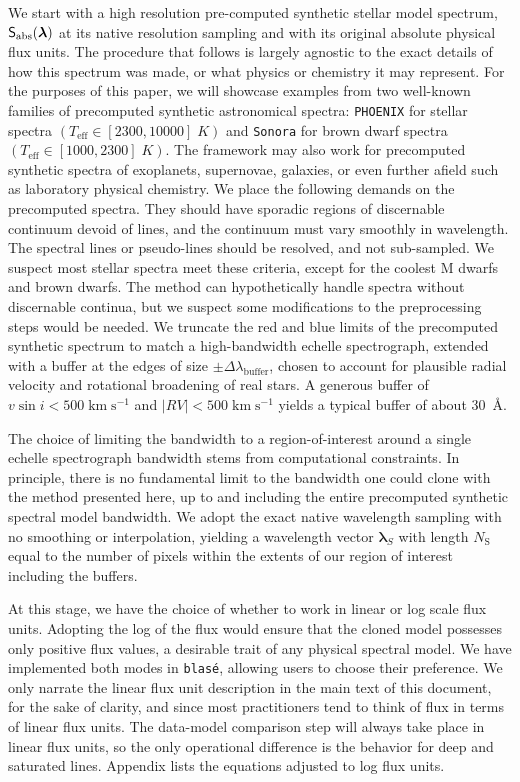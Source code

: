 \documentclass[modern]{aastex631}
\def\kmps{\mathrm{km}\;\mathrm{s}^{-1}}
\begin{document}
We start with a high resolution pre-computed synthetic stellar model spectrum, $\mathsf{S}_{\rm abs}(\bm{\lambda})$ at its native resolution sampling and with its original absolute physical flux units. The procedure that follows is largely agnostic to the exact details of how this spectrum was made, or what physics or chemistry it may represent. For the purposes of this paper, we will showcase examples from two well-known families of precomputed synthetic astronomical spectra: \texttt{PHOENIX} \citep{husser13} for stellar spectra $(T_{\mathrm{eff}}\in [2300, 10000]\;K)$ and \texttt{Sonora} \citep{2021ApJ...920...85M} for brown dwarf spectra $(T_{\mathrm{eff}}\in [1000, 2300]\;K)$. The framework may also work for precomputed synthetic spectra of exoplanets, supernovae, galaxies, or even further afield such as laboratory physical chemistry.  We place the following demands on the precomputed spectra. They should have sporadic regions of discernable continuum devoid of lines, and the continuum must vary smoothly in wavelength. The spectral lines or pseudo-lines should be resolved, and not sub-sampled. We suspect most stellar spectra meet these criteria, except for the coolest M dwarfs and brown dwarfs. The method can hypothetically handle spectra without discernable continua, but we suspect some modifications to the preprocessing steps would be needed. We truncate the red and blue limits of the precomputed synthetic spectrum to match a high-bandwidth echelle spectrograph, extended with a buffer at the edges of size $\pm \Delta \lambda_{\mathrm{buffer}}$, chosen to account for plausible radial velocity and rotational broadening of real stars. A generous buffer of $v \sin{i} < 500 \;\kmps$ and $|RV|<500 \;\kmps$ yields a typical buffer of about 30~\AA.

The choice of limiting the bandwidth to a region-of-interest around a single echelle spectrograph bandwidth stems from computational constraints. In principle, there is no fundamental limit to the bandwidth one could clone with the method presented here, up to and including the entire precomputed synthetic spectral model bandwidth. We adopt the exact native wavelength sampling with no smoothing or interpolation, yielding a wavelength vector $\bm{\lambda}_S$ with length $N_\mathrm{S}$ equal to the number of pixels within the extents of our region of interest including the buffers.

At this stage, we have the choice of whether to work in linear or log scale flux units. Adopting the log of the flux would ensure that the cloned model possesses only positive flux values, a desirable trait of any physical spectral model. We have implemented both modes in \texttt{blas\'e}, allowing users to choose their preference.  We only narrate the linear flux unit description in the main text of this document, for the sake of clarity, and since most practitioners tend to think of flux in terms of linear flux units.  The data-model comparison step will always take place in linear flux units, so the only operational difference is the behavior for deep and saturated lines.  Appendix  lists the equations adjusted to log flux units.
\end{document}
